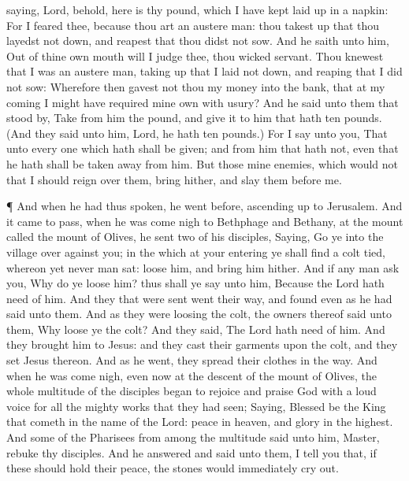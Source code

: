 saying, Lord, behold, here is thy pound, which I have kept laid up in a
napkin:  For I feared thee, because thou art an austere
man: thou takest up that thou layedst not down, and reapest that thou
didst not sow.  And he saith unto him, Out of thine own
mouth will I judge thee, thou wicked servant. Thou knewest that I was an
austere man, taking up that I laid not down, and reaping that I did not
sow:  Wherefore then gavest not thou my money into the
bank, that at my coming I might have required mine own with usury?
 And he said unto them that stood by, Take from him the
pound, and give it to him that hath ten pounds.  (And they
said unto him, Lord, he hath ten pounds.)  For I say unto
you, That unto every one which hath shall be given; and from him that
hath not, even that he hath shall be taken away from him. 
But those mine enemies, which would not that I should reign over them,
bring hither, and slay them before me.

 ¶ And when he had thus spoken, he went before, ascending
up to Jerusalem.  And it came to pass, when he was come
nigh to Bethphage and Bethany, at the mount called the mount of Olives,
he sent two of his disciples,  Saying, Go ye into the
village over against you; in the which at your entering ye shall find a
colt tied, whereon yet never man sat: loose him, and bring him hither.
 And if any man ask you, Why do ye loose him? thus shall ye
say unto him, Because the Lord hath need of him.  And they
that were sent went their way, and found even as he had said unto them.
 And as they were loosing the colt, the owners thereof said
unto them, Why loose ye the colt?  And they said, The Lord
hath need of him.  And they brought him to Jesus: and they
cast their garments upon the colt, and they set Jesus thereon.
 And as he went, they spread their clothes in the way.
 And when he was come nigh, even now at the descent of the
mount of Olives, the whole multitude of the disciples began to rejoice
and praise God with a loud voice for all the mighty works that they had
seen;  Saying, Blessed be the King that cometh in the name
of the Lord: peace in heaven, and glory in the highest. 
And some of the Pharisees from among the multitude said unto him,
Master, rebuke thy disciples.  And he answered and said
unto them, I tell you that, if these should hold their peace, the stones
would immediately cry out.

